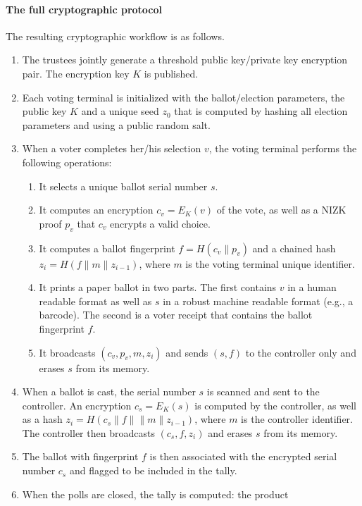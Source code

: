 \paragraph{The full cryptographic protocol}
\label{sec:full-protocol}
The resulting cryptographic workflow is as follows. 
\begin{enumerate}
\item The trustees jointly generate a threshold public key/private key
  encryption pair. The encryption key $K$ is published.
\item Each voting terminal is initialized with the ballot/election
  parameters, the public key $K$ and a unique seed $z_0$ that is
  computed by hashing all election parameters and using a public
  random salt.
\item When a voter completes her/his selection $v$, the voting terminal
  performs the following operations: 
  \begin{enumerate}
  \item It selects a unique ballot serial number $s$.
  \item It computes an encryption $c_v = E_K(v)$ of the vote, as
    well as a NIZK proof $p_v$ that $c_v$ encrypts a valid choice.
  \item It computes a ballot fingerprint $f=H(c_v \| p_v)$ and a
    chained hash $z_i = H(f \| m \| z_{i-1})$, where $m$ is the voting
    terminal unique identifier.
  \item It prints a paper ballot in two parts. The first contains $v$
    in a human readable format as well as $s$ in a robust machine
    readable format (e.g., a barcode). The second is a voter receipt that
    contains the ballot fingerprint $f$.
  \item It broadcasts $(c_v, p_v, m, z_i)$ and sends $(s, f)$ to
    the controller only and erases $s$ from its memory.
  \end{enumerate}
\item When a ballot is cast, the serial number $s$ is scanned and sent
  to the controller. An encryption $c_s = E_K(s)$ is computed by the
  controller, as well as a hash $z_{i} = H(c_s \| f \| \| m \|
  z_{i-1})$, where $m$ is the controller identifier. The controller
  then broadcasts $(c_s, f, z_i)$ and erases $s$ from its memory.
\item The ballot with fingerprint $f$ is then associated with the
  encrypted serial number $c_s$ and flagged to be included in the tally.
\item When the polls are closed, the tally is computed: the product

\end{enumerate}
